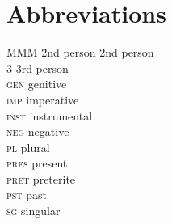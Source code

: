 \documentclass[output=paper,colorlinks,citecolor=brown]{langscibook}
\begin{document}
\section*{Abbreviations}
\begin{multicols}{3}
\begin{tabbing}
MMM \= 2nd person    \> 2nd person\\
3    \> 3rd person\\
\textsc{gen}\> genitive\\
\textsc{imp}\> imperative\\
\textsc{inst}\> instrumental\\
\textsc{neg}\> negative\\
\textsc{pl}\> plural\\
\textsc{pres}\> present\\
\textsc{pret}\> preterite\\
\textsc{pst}\> past\\
\textsc{sg}\> singular
\end{tabbing}
\end{multicols}

{\sloppy\printbibliography[heading=subbibliography,notkeyword=this]}
\cleardoublepage
\end{document}
